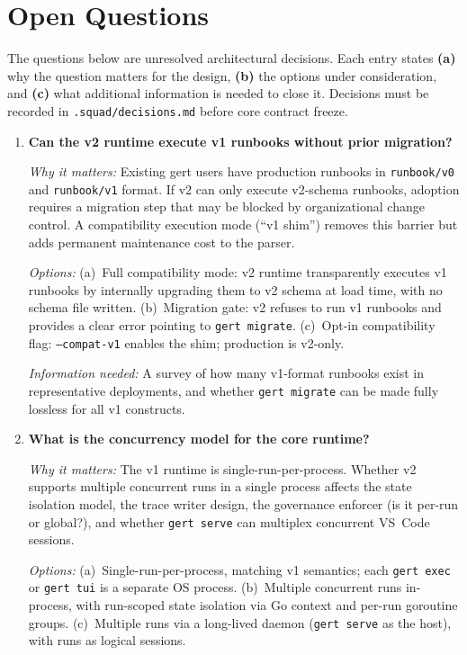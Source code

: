 \chapter{Open Questions}
\label{ch:questions}

The questions below are unresolved architectural decisions. Each entry states \textbf{(a)} why the
question matters for the design, \textbf{(b)} the options under consideration, and \textbf{(c)} what
additional information is needed to close it. Decisions must be recorded in \texttt{.squad/decisions.md}
before core contract freeze.

\begin{enumerate}[label=\textbf{Q\arabic*.}]

  \item \textbf{Can the v2 runtime execute v1 runbooks without prior migration?}

    \textit{Why it matters:} Existing gert users have production runbooks in \texttt{runbook/v0} and
    \texttt{runbook/v1} format. If v2 can only execute v2-schema runbooks, adoption requires a
    migration step that may be blocked by organizational change control. A compatibility execution mode
    (``v1 shim'') removes this barrier but adds permanent maintenance cost to the parser.

    \textit{Options:} (a)~Full compatibility mode: v2 runtime transparently executes v1 runbooks by
    internally upgrading them to v2 schema at load time, with no schema file written. (b)~Migration
    gate: v2 refuses to run v1 runbooks and provides a clear error pointing to \texttt{gert migrate}.
    (c)~Opt-in compatibility flag: \texttt{--compat-v1} enables the shim; production is v2-only.

    \textit{Information needed:} A survey of how many v1-format runbooks exist in representative
    deployments, and whether \texttt{gert migrate} can be made fully lossless for all v1 constructs.

  \item \textbf{What is the concurrency model for the core runtime?}

    \textit{Why it matters:} The v1 runtime is single-run-per-process. Whether v2 supports multiple
    concurrent runs in a single process affects the state isolation model, the trace writer design,
    the governance enforcer (is it per-run or global?), and whether \texttt{gert serve} can multiplex
    concurrent VS~Code sessions.

    \textit{Options:} (a)~Single-run-per-process, matching v1 semantics; each \texttt{gert exec} or
    \texttt{gert tui} is a separate OS process. (b)~Multiple concurrent runs in-process, with
    run-scoped state isolation via Go context and per-run goroutine groups. (c)~Multiple runs via a
    long-lived daemon (\texttt{gert serve} as the host), with runs as logical sessions.


\end{enumerate}
